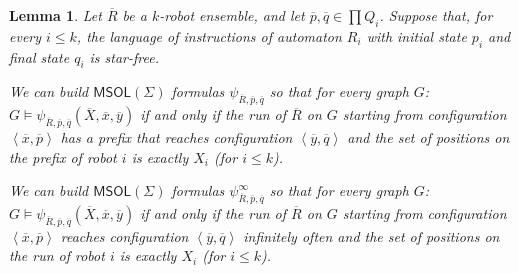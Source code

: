 \documentclass{aamas2015}
\newtheorem{lem}{Lemma}
\newcommand{\tup}[1]{\overline{#1}}
\newcommand{\tpl}[1]{\left<{#1}\right>}
\def\msol{\mathsf{MSOL}}
\begin{document}
\begin{lem} \label{lem:kcompile}
Let $\tup{R}$ be a $k$-robot ensemble, and let $\tup{p}, \tup{q} \in \prod Q_i$. Suppose that, for every $i \leq k$, the language of instructions of automaton $R_i$ with initial state $p_i$ and final state $q_i$ is star-free.

We can build $\msol(\Sigma)$ formulas $\psi_{\tup{R},\tup{p},\tup{q}}$ so that for every graph $G$:
$G \models \psi_{\tup{R},\tup{p},\tup{q}}(\tup{X},\tup{x},\tup{y})$ if and only if the run of $\tup{R}$ on $G$ starting from configuration $\tpl{\tup{x},\tup{p}}$ has a prefix that reaches configuration $\tpl{\tup{y},\tup{q}}$ and the set of positions on the prefix of robot $i$ is exactly $X_i$ (for $i \leq k$).

We can build $\msol(\Sigma)$ formulas $\psi^\infty_{\tup{R},\tup{p},\tup{q}}$ so that for every graph $G$: $G \models \psi_{\tup{R},\tup{p},\tup{q}}(\tup{X},\tup{x},\tup{y})$ if and only if the run of $\tup{R}$ on $G$ starting from configuration $\tpl{\tup{x},\tup{p}}$ reaches configuration $\tpl{\tup{y},\tup{q}}$ infinitely often and the set of positions on the run of robot $i$ is exactly $X_i$ (for $i \leq k$).
\end{lem}
%
\end{document}
